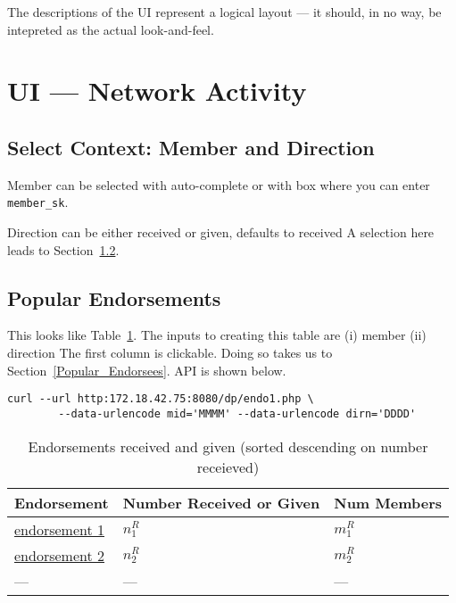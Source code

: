 The descriptions of the UI represent a
logical layout --- it should, in no way, be intepreted as the actual
look-and-feel.

\section{UI --- Network Activity}
\label{ui_network}


\subsection{Select Context: Member and Direction}
\label{Select_Member}

\bi
\item Member can be selected with auto-complete or with box where you can enter
\verb+member_sk+. 
\item Direction can be either received or given, defaults to received
\ei
A selection here leads to Section~\ref{Popular_Endorsements}.

\subsection{Popular Endorsements}
\label{Popular_Endorsements}

This looks like Table~\ref{tbl_popular_endorsements}. The inputs to
creating this table are (i) member (ii) direction
The first column is
clickable. Doing so takes us to Section~\ref{Popular_Endorsees}. 
API is shown below.
\begin{verbatim}
curl --url http:172.18.42.75:8080/dp/endo1.php \
       	--data-urlencode mid='MMMM' --data-urlencode dirn='DDDD'
\end{verbatim}

\begin{table}[hb]
\centering
\begin{tabular}{|l|l|l|} \hline \hline
{\bf Endorsement} & {\bf Number Received or Given} & {\bf Num Members}
\\ \hline \hline
\url{endorsement 1} & \(n^R_1\) & \(m^R_1\) \\ \hline 
\url{endorsement 2} & \(n^R_2\) & \(m^R_2\) \\ \hline
--- & --- & --- \\ \hline
\hline
\end{tabular}
\caption{Endorsements received and given (sorted descending on number
    receieved)}
\label{tbl_popular_endorsements}
\end{table}

